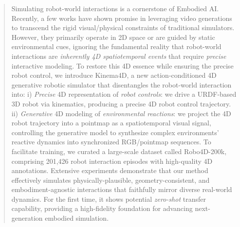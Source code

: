 \begin{abstract}
Simulating robot-world interactions is a cornerstone of Embodied AI. Recently, a few works have shown promise in leveraging video generations to transcend the rigid visual/physical constraints of traditional simulators.
However, they primarily operate in 2D space or are guided by static environmental cues, ignoring the fundamental reality that robot-world interactions are \textit{inherently 4D spatiotemporal events} that require \textit{precise} interactive modeling.
To restore this 4D essence while ensuring the precise robot control,
we introduce Kinema4D, a new action-conditioned 4D generative robotic simulator that disentangles the robot-world interaction into:
i) \textit{Precise} 4D representation of \textit{robot controls}: we drive a URDF-based 3D robot via kinematics, producing a precise 4D robot control trajectory. ii) \textit{Generative} 4D modeling of \textit{environmental reactions}: we project the 4D robot trajectory into a pointmap as a spatiotemporal visual signal, controlling the generative model to synthesize complex environments’ reactive dynamics into synchronized RGB/pointmap sequences.
To facilitate training, we curated a large-scale dataset called Robo4D-200k, comprising 201,426 robot interaction episodes with high-quality 4D annotations. Extensive experiments demonstrate that our method effectively simulates physically-plausible, geometry-consistent, and embodiment-agnostic interactions that faithfully mirror diverse real-world dynamics. For the first time, it shows potential \textit{zero-shot} transfer capability, providing a high-fidelity foundation for advancing next-generation embodied simulation.

\end{abstract}